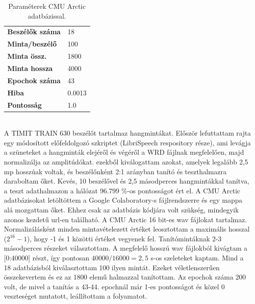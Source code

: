 \begin{table}[!ht]
	\begin{tabular}{l|l} \toprule
		\bfseries Beszélők száma & 18 \\
		\rowcolor{gray!10}
		\bfseries Minta/beszélő & 100\\
		\bfseries Minta össz. & 1800 \\
		\rowcolor{gray!10}
		\bfseries Minta hossza & 4000 \\
		\bfseries Epochok száma & 43\\
		\rowcolor{gray!10}
		\bfseries Hiba & 0.0013 \\ 
		\bfseries Pontosság & 1.0 \\ 
		\bottomrule
		\hline
	\end{tabular}
	\centering
	\caption{Paraméterek CMU Arctic adatbázissal.}
	\label{fig:wavenet-arctic}
\end{table}
\ \\
A TIMIT TRAIN 630 beszélőt tartalmaz hangmintákat. Először lefuttattam rajta egy módosított előfeldolgozó szkriptet (LibriSpeech respository része), ami levágja a szüneteket a hangminták elejéről és végéről a WRD fájlnak megfelelően, majd normalizálja az amplitúdókat. ezekből kiválogattam azokat, amelyek legalább 2,5 mp hosszúak voltak, és beszélőnként 2:1 arányban tanító és teszthalmazra daraboltam őket.
Kevés, 10 beszélővel és 2,5 másodperces hangmintákkal tanítva, a teszt adathalmazon a hálózat 96.799 \%-os pontosságot ért el.
\newline
\newline
A CMU Arctic adatbázisokat letöltöttem a Google Colaboratory-s fájlrendszerre és egy mappa alá mozgattam őket. Ehhez csak az adatbázis kódjára volt szükség, mindegyik azonos kezdetű url-en található.
A CMU Arctic 16 bit-es wav fájlokat tartalmaz. Normalizálásként minden mintavételezett értéket leosztottam a maximális hosszal ($2^{16} - 1$), hogy -1 és 1 közötti értéket vegyenek fel.
\newline
\newline
Tanítómintáknak 2-3 másodperces részeket választottam. A megfelelő hosszú wav fájlokból kivágtam a [0:40000] részt, így pontosan $40000/16000 = 2,5$ s-os szeleteket kaptam. Mind a 18 adatbázisból kiválasztottam 100 ilyen mintát. Ezeket véletlenszerűen összekevertem és ez az 1800 elemű halmazzal tanítottam. Az epochok száma 200 volt, de mivel a tanítás a 43-44. epochnál már 1-es pontosságot és közel 0 veszteséget mutatott, leállítottam a folyamatot. 
\newline
\newline
